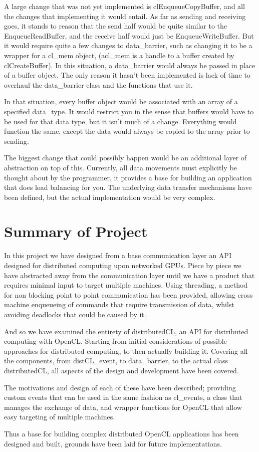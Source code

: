 \documentclass[../thesis.tex]{subfiles}
\begin{document}
A large change that was not yet implemented is clEnqueueCopyBuffer, and all the changes that implementing it would entail. As far as sending and receiving goes, it stands to reason that the send half would be quite similar to the EnqueueReadBuffer, and the receive half would just be EnqueueWriteBuffer. But it would require quite a few changes to data\_barrier, such as changing it to be a wrapper for a cl\_mem object, (acl\_mem is a handle to a buffer created by clCreateBuffer). In this situation, a data\_barrier would always be passed in place of a buffer object. The only reason it hasn't been implemented is lack of time to overhaul the data\_barrier class and the functions that use it.

In that situation, every buffer object would be associated with an array of a specified data\_type. It would restrict you in the sense that buffers would have to be used for that data type, but it isn't much of a change. Everything would function the same, except the data would always be copied to the array prior to sending.

The biggest change that could possibly happen would be an additional layer of abstraction on top of this. Currently, all data movements must explicitly be thought about by the programmer, it provides a base for building an application that does load balancing for you. The underlying data transfer mechanisms have been defined, but the actual implementation would be very complex.


\section{Summary of Project}
In this project we have designed from a base communication layer an API designed for distributed computing upon networked GPUs. Piece by piece we have abstracted away from the communication layer until we have a product that requires minimal input to target multiple machines. Using threading, a method for non blocking point to point communication has been provided, allowing cross machine enqueueing of commands that require transmission of data, whilst avoiding deadlocks that could be caused by it.

And so we have examined the entirety of distributedCL, an API for distributed computing with OpenCL. Starting from initial considerations of possible approaches for distributed computing, to then actually building it. Covering all the components, from distCL\_event, to data\_barrier, to the actual class distributedCL, all aspects of the design and development have been covered.

The motivations and design of each of these have been described; providing custom events that can be used in the same fashion as cl\_events, a class that manages the exchange of data, and wrapper functions for OpenCL that allow easy targeting of multiple machines.

Thus a base for building complex distributed OpenCL applications has been designed and built, grounds have been laid for future implementations.
\end{document}
